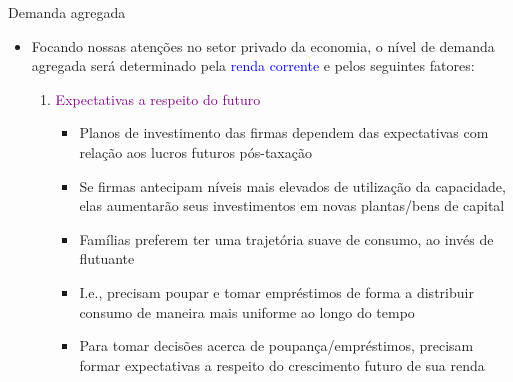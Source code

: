 \documentclass[10pt]{beamer}
\begin{document}
\begin{frame}{Demanda agregada}
    \begin{itemize}
        \item Focando nossas atenções no setor privado da economia, o nível de demanda agregada será determinado pela \textcolor{blue}{renda corrente} e pelos seguintes fatores:\bigskip
         
        \begin{enumerate}
            \item \textcolor{purple}{Expectativas a respeito do futuro}\medskip
            \begin{itemize}
                \item Planos de investimento das firmas dependem das expectativas com relação aos lucros futuros pós-taxação\medskip
                 
                \item Se firmas antecipam níveis mais elevados de utilização da capacidade, elas aumentarão seus investimentos em novas plantas/bens de capital\medskip
                 
                \item Famílias preferem ter uma trajetória suave de consumo, ao invés de flutuante\medskip
                 
                \item I.e., precisam poupar e tomar empréstimos de forma a distribuir consumo de maneira mais uniforme ao longo do tempo\medskip
                 
                \item Para tomar decisões acerca de poupança/empréstimos, precisam formar expectativas a respeito do crescimento futuro de sua renda
            \end{itemize}                        
        \end{enumerate}
    \end{itemize}
\end{frame}
\end{document}
